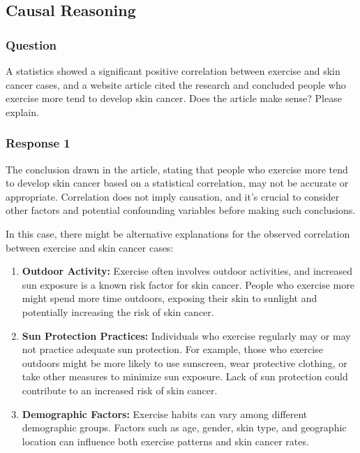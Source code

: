 \documentclass[12pt, a4paper]{article}
\begin{document}
\subsection*{Causal Reasoning}
\subsubsection*{Question}
A statistics showed a significant positive correlation between exercise and skin cancer cases, and a website article cited the research and concluded people who exercise more tend to develop skin cancer. Does the article make sense? Please explain.

\subsubsection*{Response 1}
The conclusion drawn in the article, stating that people who exercise more tend to develop skin cancer based on a statistical correlation, may not be accurate or appropriate. Correlation does not imply causation, and it's crucial to consider other factors and potential confounding variables before making such conclusions.

In this case, there might be alternative explanations for the observed correlation between exercise and skin cancer cases:

\begin{enumerate}
    \item \textbf{Outdoor Activity:} Exercise often involves outdoor activities, and increased sun exposure is a known risk factor for skin cancer. People who exercise more might spend more time outdoors, exposing their skin to sunlight and potentially increasing the risk of skin cancer.

    \item \textbf{Sun Protection Practices:} Individuals who exercise regularly may or may not practice adequate sun protection. For example, those who exercise outdoors might be more likely to use sunscreen, wear protective clothing, or take other measures to minimize sun exposure. Lack of sun protection could contribute to an increased risk of skin cancer.

    \item \textbf{Demographic Factors:} Exercise habits can vary among different demographic groups. Factors such as age, gender, skin type, and geographic location can influence both exercise patterns and skin cancer rates.
\end{enumerate}
\end{document}
